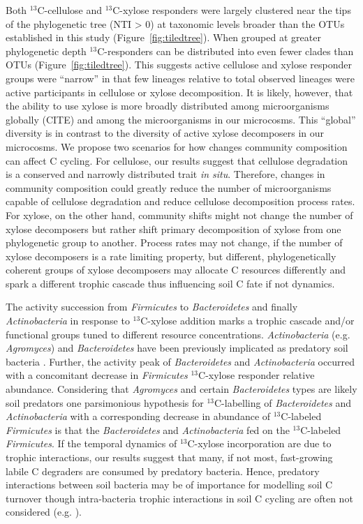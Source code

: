 Both $^{13}$C-cellulose and $^{13}$C-xylose responders were largely clustered
near the tips of the phylogenetic tree (NTI > 0) at taxonomic levels broader
than the OTUs established in this study (Figure~\ref{fig:tiledtree}). When
grouped at greater phylogenetic depth $^{13}$C-responders can be distributed
into even fewer clades than OTUs (Figure~\ref{fig:tiledtree}). This suggests
active cellulose and xylose responder groups were ``narrow'' in that few
lineages relative to total observed lineages were active participants in
cellulose or xylose decomposition. It is likely, however, that the ability to
use xylose is more broadly distributed among microorganisms globally (CITE) and
among the microorganisms in our microcosms. This ``global'' diversity is in
contrast to the diversity of active xylose decomposers in our microcosms. We
propose two scenarios for how changes community composition can affect
C cycling. For cellulose, our results suggest that cellulose degradation is
a conserved and narrowly distributed trait \textit{in situ}. Therefore, changes
in community composition could greatly reduce the number of microorganisms
capable of cellulose degradation and reduce cellulose decomposition process
rates. For xylose, on the other hand, community shifts might not change the
number of xylose decomposers but rather shift primary decomposition of xylose
from one phylogenetic group to another. Process rates may not change, if the
number of xylose decomposers is a rate limiting property,  but different,
phylogenetically coherent groups of xylose decomposers may allocate C resources
differently and spark a different trophic cascade thus influencing soil C fate
if not dynamics. 

The activity succession from \textit{Firmicutes} to \textit{Bacteroidetes} and
finally \textit{Actinobacteria} in response to $^{13}$C-xylose addition marks
a trophic cascade and/or functional groups tuned to different resource
concentrations. \textit{Actinobacteria} (e.g. \textit{Agromyces}) and
\textit{Bacteroidetes} have been previously implicated as predatory soil
bacteria \citep{Lueders2006}. Further, the activity peak of
\textit{Bacteroidetes} and \textit{Actinobacteria} occurred with a concomitant
decrease in \textit{Firmicutes} $^{13}$C-xylose responder relative abundance.
Considering that \textit{Agromyces} and certain \textit{Bacteroidetes} types
are likely soil predators \citep{Lueders2006,16346402} one parsimonious
hypothesis for $^{13}$C-labelling of \textit{Bacteroidetes} and
\textit{Actinobacteria} with a corresponding decrease in abundance of
$^{13}$C-labeled \textit{Firmicutes} is that the \textit{Bacteroidetes} and
\textit{Actinobacteria} fed on the $^{13}$C-labeled \textit{Firmicutes}. If the
temporal dynamics of $^{13}$C-xylose incorporation are due to trophic
interactions, our results suggest that many, if not most, fast-growing labile
C degraders are consumed by predatory bacteria. Hence, predatory interactions
between soil bacteria may be of importance for modelling soil C turnover though
intra-bacteria trophic interactions in soil C cycling are often not considered
(e.g. \citep{Moore1988}).

